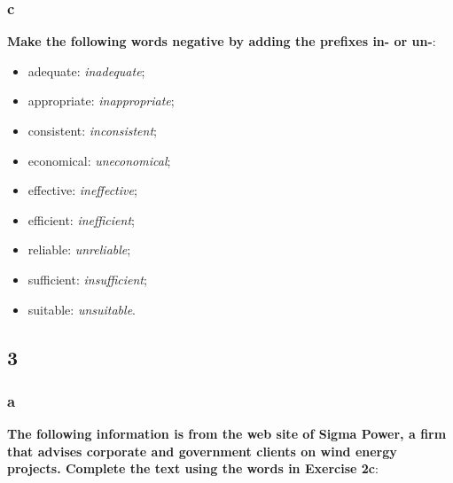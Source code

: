 \subsubsection{c}

\textbf{Make the following words negative by adding the prefixes in- or un-}:

\begin{itemize}

\item adequate: \textit{inadequate};
\item appropriate: \textit{inappropriate};
\item consistent: \textit{inconsistent};
\item economical: \textit{uneconomical};
\item effective: \textit{ineffective};
\item efficient: \textit{inefficient};
\item reliable: \textit{unreliable};
\item sufficient: \textit{insufficient};
\item suitable: \textit{unsuitable}.

\end{itemize}

\subsection{3}

\subsubsection{a}

\textbf{The following information is from the web site of Sigma Power, a firm that advises corporate and government clients on wind energy projects. Complete the text using the words in Exercise 2c}:

